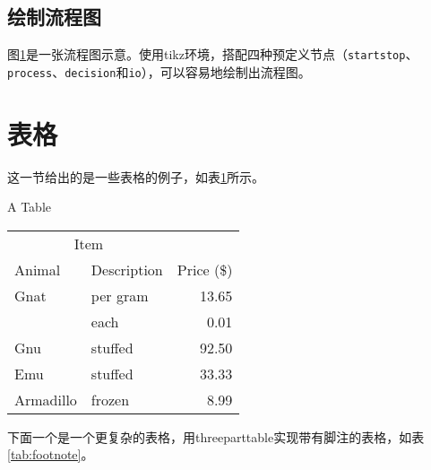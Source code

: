 \subsection{绘制流程图}

图\ref{fig:flow_chart}是一张流程图示意。使用tikz环境，搭配四种预定义节点（\verb+startstop+、\verb+process+、\verb+decision+和\verb+io+），可以容易地绘制出流程图。
\begin{figure}[!htp]
    \centering
    \resizebox{6cm}{!}{}
    \label{fig:flow_chart}
\end{figure}

\clearpage

\section{表格}
\label{sec:tab}

这一节给出的是一些表格的例子，如表\ref{tab:firstone}所示。

\begin{table}[!hpb]
  \centering
    {A Table}
  \label{tab:firstone}
  \begin{tabular}{@{}llr@{}} \toprule
    \multicolumn{2}{c}{Item} \\ \cmidrule(r){1-2}
    Animal & Description & Price (\$)\\ \midrule
    Gnat & per gram & 13.65 \\
    & each & 0.01 \\
    Gnu & stuffed & 92.50 \\
    Emu & stuffed & 33.33 \\
    Armadillo & frozen & 8.99 \\ \bottomrule
  \end{tabular}
\end{table}

下面一个是一个更复杂的表格，用threeparttable实现带有脚注的表格，如表\ref{tab:footnote}。

